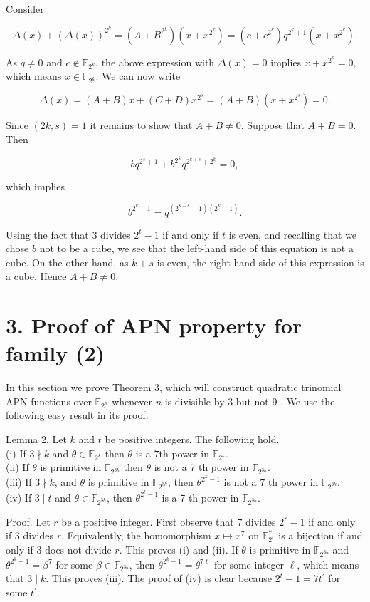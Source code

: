 \documentclass[10pt]{article}
\begin{document}
Consider

$$
\Delta(x)+(\Delta(x))^{2^{k}}=\left(A+B^{2^{k}}\right)\left(x+x^{2^{k}}\right)=\left(c+c^{2^{k}}\right) q^{2^{k}+1}\left(x+x^{2^{k}}\right) .
$$

As $q \neq 0$ and $c \notin \mathbb{F}_{2^{k}}$, the above expression with $\Delta(x)=0$ implies $x+x^{2^{k}}=0$, which means $x \in \mathbb{F}_{2^{k}}$. We can now write

$$
\Delta(x)=(A+B) x+(C+D) x^{2^{s}}=(A+B)\left(x+x^{2^{s}}\right)=0 .
$$

Since $(2 k, s)=1$ it remains to show that $A+B \neq 0$. Suppose that $A+B=0$. Then

$$
b q^{2^{s}+1}+b^{2^{k}} q^{2^{k+s}+2^{k}}=0,
$$

which implies

$$
b^{2^{k}-1}=q^{\left(2^{k+s}-1\right)\left(2^{k}-1\right)} .
$$

Using the fact that 3 divides $2^{t}-1$ if and only if $t$ is even, and recalling that we chose $b$ not to be a cube, we see that the left-hand side of this equation is not a cube. On the other hand, as $k+s$ is even, the right-hand side of this expression is a cube. Hence $A+B \neq 0$.

\section*{3. Proof of APN property for family (2)}
In this section we prove Theorem 3, which will construct quadratic trinomial APN functions over $\mathbb{F}_{2^{n}}$ whenever $n$ is divisible by 3 but not 9 . We use the following easy result in its proof.

Lemma 2. Let $k$ and $t$ be positive integers. The following hold.\\
(i) If $3 \nmid k$ and $\theta \in \mathbb{F}_{2^{k}}$ then $\theta$ is a 7th power in $\mathbb{F}_{2^{k}}$.\\
(ii) If $\theta$ is primitive in $\mathbb{F}_{2^{3 k}}$ then $\theta$ is not a 7 th power in $\mathbb{F}_{2^{3 k}}$.\\
(iii) If $3 \nmid k$, and $\theta$ is primitive in $\mathbb{F}_{2^{3 k}}$, then $\theta^{2^{k}-1}$ is not a 7 th power in $\mathbb{F}_{2^{3 k}}$.\\
(iv) If $3 \mid t$ and $\theta \in \mathbb{F}_{2^{3 k}}$, then $\theta^{2^{t}-1}$ is a 7 th power in $\mathbb{F}_{2^{3 k}}$.

Proof. Let $r$ be a positive integer. First observe that 7 divides $2^{r}-1$ if and only if 3 divides $r$. Equivalently, the homomorphism $x \mapsto x^{7}$ on $\mathbb{F}_{2^{r}}^{*}$ is a bijection if and only if 3 does not divide $r$. This proves (i) and (ii). If $\theta$ is primitive in $\mathbb{F}_{2^{3 k}}$ and $\theta^{2^{k}-1}=\beta^{7}$ for some $\beta \in \mathbb{F}_{2^{3 k}}$, then $\theta^{2^{k}-1}= \theta^{7 \ell}$ for some integer $\ell$, which means that $3 \mid k$. This proves (iii). The proof of (iv) is clear because $2^{t}-1=7 t^{\prime}$ for some $t^{\prime}$.
\end{document}
